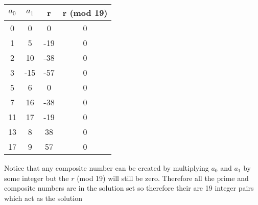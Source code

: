 \documentclass[11pt]{article}
\begin{document}
\begin{center}
 \begin{tabular}{||c c c c||} 
 \hline
$a_0$ & $a_1$ & r & r (mod 19) \\ [0.5ex] 
 \hline\hline
 0 & 0 & 0 & 0 \\ 
 \hline
 1 & 5 & -19 & 0 \\
 \hline
 2 & 10 & -38 & 0 \\
 \hline
 3 & -15 & -57 & 0\\
 \hline
 5 &  6 & 0 & 0 \\ 
 \hline
 7 & 16  & -38 & 0 \\
 \hline
 11 & 17 & -19 & 0 \\ 
 \hline
13 & 8 & 38 & 0\\ 
 \hline
17 &  9 & 57 & 0\\ 
 \hline
\end{tabular}
\end{center}
Notice that any composite number can be created by multiplying $a_0$ and $a_1$ by some integer but the $r$ (mod 19) will still be zero. Therefore all the prime and composite numbers are in the solution set so therefore their are 19 integer pairs which act as the solution
\end{document}
